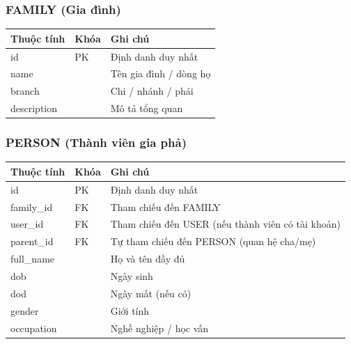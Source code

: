 \subsubsection{FAMILY (Gia đình)}
\begin{longtable}{@{}p{3cm}p{2cm}p{9.5cm}@{}}
\toprule
\textbf{Thuộc tính} & \textbf{Khóa} & \textbf{Ghi chú} \\
\midrule
id & PK & Định danh duy nhất \\
name & & Tên gia đình / dòng họ \\
branch & & Chi / nhánh / phái \\
description & & Mô tả tổng quan \\
\bottomrule
\end{longtable}

\subsubsection{PERSON (Thành viên gia phả)}
\begin{longtable}{@{}p{3cm}p{2cm}p{9.5cm}@{}}
\toprule
\textbf{Thuộc tính} & \textbf{Khóa} & \textbf{Ghi chú} \\
\midrule
id & PK & Định danh duy nhất \\
family\_id & FK & Tham chiếu đến FAMILY \\
user\_id & FK & Tham chiếu đến USER (nếu thành viên có tài khoản) \\
parent\_id & FK & Tự tham chiếu đến PERSON (quan hệ cha/mẹ) \\
full\_name & & Họ và tên đầy đủ \\
dob & & Ngày sinh \\
dod & & Ngày mất (nếu có) \\
gender & & Giới tính \\
occupation & & Nghề nghiệp / học vấn \\
\bottomrule
\end{longtable}

